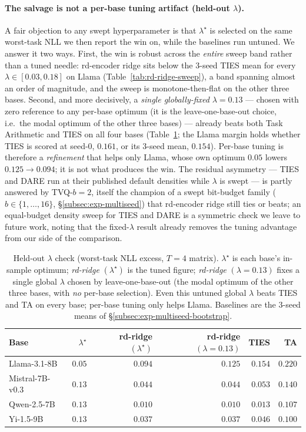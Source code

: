 \paragraph{The salvage is not a per-base tuning artifact (held-out
$\lambda$).} A fair objection to any swept hyperparameter is that
$\lambda^\star$ is selected on the same worst-task NLL we then report
the win on, while the baselines run untuned. We answer it two ways.
First, the win is robust across the \emph{entire} sweep band rather
than a tuned needle: rd-encoder ridge sits below the $3$-seed TIES
mean for every $\lambda \in [0.03, 0.18]$ on Llama
(Table~\ref{tab:rd-ridge-sweep}),
a band spanning almost an order of magnitude, and the sweep is
monotone-then-flat on the other three bases. Second, and more
decisively, a \emph{single globally-fixed} $\lambda = 0.13$ --- chosen
with zero reference to any per-base optimum (it is the
leave-one-base-out choice, i.e.\ the modal optimum of the other three
bases) --- already beats both Task Arithmetic and TIES on all four
bases (Table~\ref{tab:rd-ridge-heldout}; the Llama margin holds
whether TIES is scored at seed-0, $0.161$, or its $3$-seed mean,
$0.154$). Per-base tuning is therefore
a \emph{refinement} that helps only Llama, whose own optimum $0.05$
lowers $0.125 \to 0.094$; it is not what produces the win. The
residual asymmetry --- TIES and DARE run at their published default
densities while $\lambda$ is swept --- is partly answered by
TVQ-$b{=}2$, itself the champion of a swept bit-budget family
($b \in \{1, \dots, 16\}$, \S\ref{subsec:exp-multiseed}) that
rd-encoder ridge still ties or beats; an equal-budget density sweep
for TIES and DARE is a symmetric check we leave to future work, noting
that the fixed-$\lambda$ result already removes the tuning advantage
from our side of the comparison.

\begin{table}[t]
\centering
\caption{Held-out $\lambda$ check (worst-task NLL excess, $T = 4$
matrix). $\lambda^\star$ is each base's in-sample optimum;
\emph{rd-ridge} $(\lambda^\star)$ is the tuned figure;
\emph{rd-ridge} $(\lambda{=}0.13)$ fixes a single global $\lambda$
chosen by leave-one-base-out (the modal optimum of the other three
bases, with \emph{no} per-base selection). Even this untuned global
$\lambda$ beats TIES and TA on every base; per-base tuning only helps
Llama. Baselines are the $3$-seed means of \S\ref{subsec:exp-multiseed-bootstrap}.}
\label{tab:rd-ridge-heldout}
\begin{tabular}{lrrrrr}
\hline
Base & $\lambda^\star$ & rd-ridge $(\lambda^\star)$ & rd-ridge $(\lambda{=}0.13)$ & TIES & TA \\
\hline
Llama-3.1-8B    & $0.05$ & $\mathbf{0.094}$ & $0.125$ & $0.154$ & $0.220$ \\
Mistral-7B-v0.3 & $0.13$ & $\mathbf{0.044}$ & $0.044$ & $0.053$ & $0.140$ \\
Qwen-2.5-7B     & $0.13$ & $\mathbf{0.010}$ & $0.010$ & $0.013$ & $0.107$ \\
Yi-1.5-9B       & $0.13$ & $\mathbf{0.037}$ & $0.037$ & $0.046$ & $0.100$ \\
\hline
\end{tabular}
\end{table}

